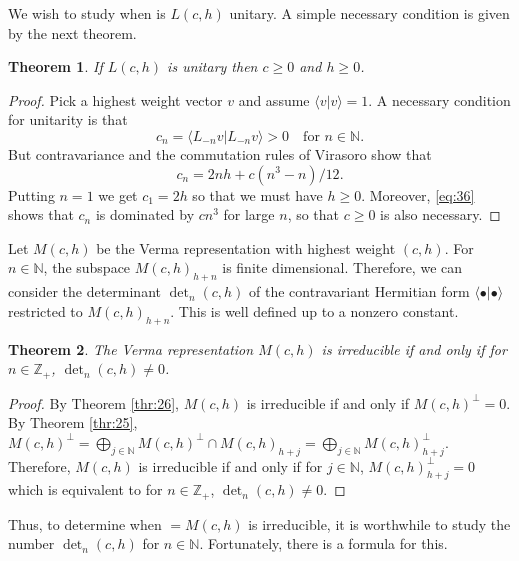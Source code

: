 \documentclass[a4paper, 12pt, reqno]{amsart}
\newtheorem{theorem}{Theorem}[subsection]
\theoremstyle{remark}
\numberwithin{equation}{subsection}
\begin{document}
We wish to study when is $L(c,h)$ unitary.
A simple necessary condition is given by the next theorem.

\begin{theorem}
  \label{thr:27}
  If $L(c, h)$ is unitary then $c \ge 0$ and $h \ge 0$.
\end{theorem}

\begin{proof}
  Pick a highest weight vector $v$ and assume $\langle v| v\rangle=1$.
  A necessary condition for unitarity is that
  \begin{equation*}
    c_n = \langle L_{-n}v| L_{-n}v\rangle > 0 \quad \text{for } n \in \mathbb{N}.
  \end{equation*}
  But contravariance and the commutation rules of Virasoro show that
  \begin{equation}
    \label{eq:36}
    c_n = 2nh + c(n^3 - n)/12.
  \end{equation}
  Putting $n = 1$ we get $c_1 = 2h$ so that we must have $h \ge 0$.
  Moreover, \eqref{eq:36} shows that $c_n$ is dominated by $cn^3$ for large $n$, so that $c \ge 0$ is also necessary.
\end{proof}

Let $M(c, h)$ be the Verma representation with highest weight $(c, h)$.
For $n \in \mathbb{N}$, the subspace $M(c, h)_{h + n}$ is finite dimensional.
Therefore, we can consider the determinant $\det_n(c, h)$ of the contravariant Hermitian form $\langle \bullet| \bullet\rangle$ restricted to $M(c, h)_{h + n}$.
This is well defined up to a nonzero constant.

\begin{theorem}
  \label{thr:28}
  The Verma representation $M(c, h)$ is irreducible if and only if for $n \in \mathbb{Z}_+$, $\det_n(c, h) \neq 0$.
\end{theorem}

\begin{proof}
  By Theorem \ref{thr:26}, $M(c, h)$ is irreducible if and only if $M(c, h)^{\perp} = 0$.
  By Theorem \ref{thr:25}, $M(c, h)^{\perp} = \bigoplus_{j \in \mathbb{N}}M(c, h)^{\perp} \cap M(c, h)_{h + j} = \bigoplus_{j \in \mathbb{N}}M(c, h)_{h + j}^{\perp}$.
  Therefore, $M(c, h)$ is irreducible if and only if for $j \in \mathbb{N}$, $M(c, h)_{h + j}^{\perp} = 0$ which is equivalent to for $n \in \mathbb{Z}_+$, $\det_n(c, h) \neq 0$.
\end{proof}

Thus, to determine when $=M(c, h)$ is irreducible, it is worthwhile to study the number $\det_n(c, h)$ for $n \in \mathbb{N}$.
Fortunately, there is a formula for this.
\end{document}
